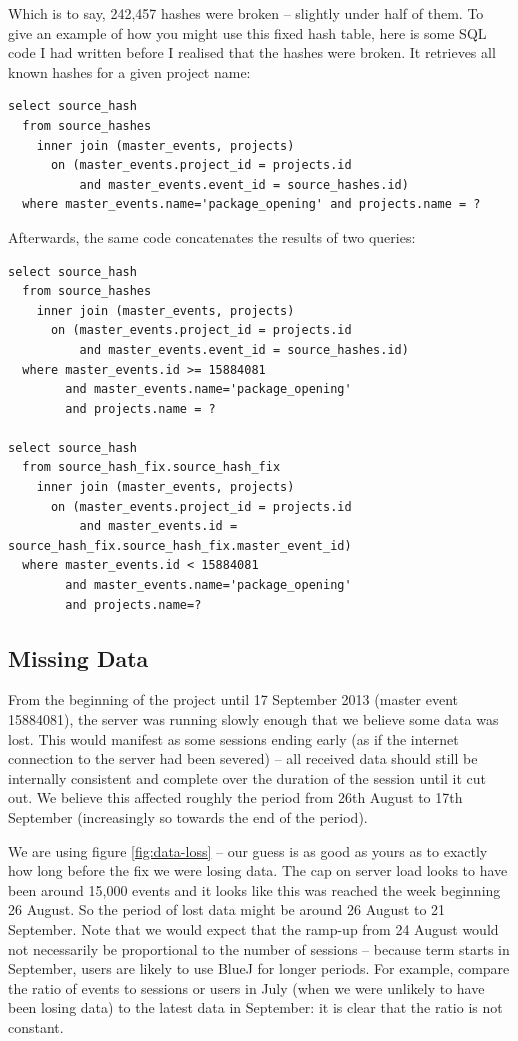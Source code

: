 \documentclass{report}
\begin{document}
Which is to say, 242,457 hashes were broken -- slightly under half of them.  To give an example of how you might use this fixed hash table, here is some SQL code I had written before I realised that the hashes were broken.  It retrieves all known hashes for a given project name:

\begin{lstlisting}
select source_hash
  from source_hashes
    inner join (master_events, projects)
      on (master_events.project_id = projects.id
          and master_events.event_id = source_hashes.id)
  where master_events.name='package_opening' and projects.name = ?
\end{lstlisting}

Afterwards, the same code concatenates the results of two queries:

\begin{lstlisting}
select source_hash
  from source_hashes
    inner join (master_events, projects)
      on (master_events.project_id = projects.id
          and master_events.event_id = source_hashes.id)
  where master_events.id >= 15884081
        and master_events.name='package_opening'
        and projects.name = ?

select source_hash
  from source_hash_fix.source_hash_fix
    inner join (master_events, projects)
      on (master_events.project_id = projects.id
          and master_events.id = source_hash_fix.source_hash_fix.master_event_id)
  where master_events.id < 15884081
        and master_events.name='package_opening'
        and projects.name=?
\end{lstlisting}

\lstset{columns=flexible,language=SQL,basicstyle=\ttfamily}
\subsection{Missing Data}

From the beginning of the project until 17 September 2013 (master event 15884081), the server was running slowly enough that we believe some data was lost.  This would manifest as some sessions ending early (as if the internet connection to the server had been severed) -- all received data should still be internally consistent and complete over the duration of the session until it cut out.  We believe this affected roughly the period from 26th August to 17th September (increasingly so towards the end of the period).

We are using figure \ref{fig:data-loss} -- our guess is as good as yours as to exactly how long before the fix we were losing data.  The cap on server load looks to have been around 15,000 events and it looks like this was reached the week beginning 26 August.  So the period of lost data might be around 26 August to 21 September.  Note that we would expect that the ramp-up from 24 August would not necessarily be proportional to the number of sessions -- because term starts in September, users are likely to use BlueJ for longer periods.  For example, compare the ratio of events to sessions or users in July (when we were unlikely to have been losing data) to the latest data in September: it is clear that the ratio is not constant.
\end{document}
